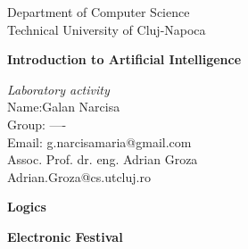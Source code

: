 ﻿\documentclass[a4paper,12pt]{report}
\begin{document}
\vspace{-5cm}
\begin{center}
Department of Computer Science\\
Technical University of Cluj-Napoca\\

\end{center}
\vspace{1cm}
\begin{center}
\begin{Large}
 \textbf{Introduction to Artificial Intelligence}\\
\end{Large}
\textit{Laboratory activity}\\
\vspace{3cm}
Name:Galan Narcisa\\
Group: ----\\
Email: g.narcisamaria@gmail.com\\
\vspace{12cm}
Assoc. Prof. dr. eng. Adrian Groza\\
Adrian.Groza@cs.utcluj.ro\\
\vspace{1cm}

\end{center}
\vspace{5cm}






\begin{center}
\begin{Large}
 \textbf{Logics}\\
\end{Large}
\end{center}
\vspace{3cm}

\begin{Large}
 \textbf{Electronic Festival}\\
\end{Large}
\end{document}
